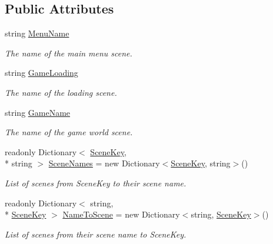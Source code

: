 \subsection*{Public Attributes}
\begin{DoxyCompactItemize}
\item 
string \hyperlink{class_skyrates_1_1_client_1_1_scene_1_1_scene_data_a4dca2dede679e6f2a2d59f76f2a1f1b6}{Menu\-Name}
\begin{DoxyCompactList}\small\item\em The name of the main menu scene. \end{DoxyCompactList}\item 
string \hyperlink{class_skyrates_1_1_client_1_1_scene_1_1_scene_data_a0abaaefcca3b7a51f6ea7c67a9f20b2f}{Game\-Loading}
\begin{DoxyCompactList}\small\item\em The name of the loading scene. \end{DoxyCompactList}\item 
string \hyperlink{class_skyrates_1_1_client_1_1_scene_1_1_scene_data_a48d1b49f072d6c1962ef98e479018d4d}{Game\-Name}
\begin{DoxyCompactList}\small\item\em The name of the game world scene. \end{DoxyCompactList}\item 
readonly Dictionary$<$ \hyperlink{class_skyrates_1_1_client_1_1_scene_1_1_scene_data_a31ee71a248fd3456a7e655f71f268583}{Scene\-Key}, \\*
string $>$ \hyperlink{class_skyrates_1_1_client_1_1_scene_1_1_scene_data_a557060e5171ba38f4763c95b5e2b9c3c}{Scene\-Names} = new Dictionary$<$\hyperlink{class_skyrates_1_1_client_1_1_scene_1_1_scene_data_a31ee71a248fd3456a7e655f71f268583}{Scene\-Key}, string$>$()
\begin{DoxyCompactList}\small\item\em List of scenes from Scene\-Key to their scene name. \end{DoxyCompactList}\item 
readonly Dictionary$<$ string, \\*
\hyperlink{class_skyrates_1_1_client_1_1_scene_1_1_scene_data_a31ee71a248fd3456a7e655f71f268583}{Scene\-Key} $>$ \hyperlink{class_skyrates_1_1_client_1_1_scene_1_1_scene_data_a711010b1f45c341f1617742c94263ceb}{Name\-To\-Scene} = new Dictionary$<$string, \hyperlink{class_skyrates_1_1_client_1_1_scene_1_1_scene_data_a31ee71a248fd3456a7e655f71f268583}{Scene\-Key}$>$()
\begin{DoxyCompactList}\small\item\em List of scenes from their scene name to Scene\-Key. \end{DoxyCompactList}\end{DoxyCompactItemize}


